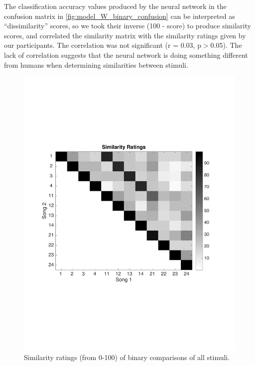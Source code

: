 The classification accuracy values produced by the neural network in the confusion matrix in \autoref{fig:model_W_binary_confusion} can be interpreted as ``dissimilarity'' scores, so we took their inverse (100 - score) to produce similarity scores, and correlated the similarity matrix with the similarity ratings given by our participants.
The correlation was not significant (r = 0.03, p$>$0.05).
The lack of correlation suggests that the neural network is doing something different from humans when determining similarities between stimuli. 
\begin{figure}[htb] 
  \begin{center}
    \includegraphics[scale=0.6]{Figures/Similarity}
    \caption{Similarity ratings (from 0-100) of binary comparisons of all stimuli.}
    \label{fig:Similarity}
  \end{center}
\end{figure}